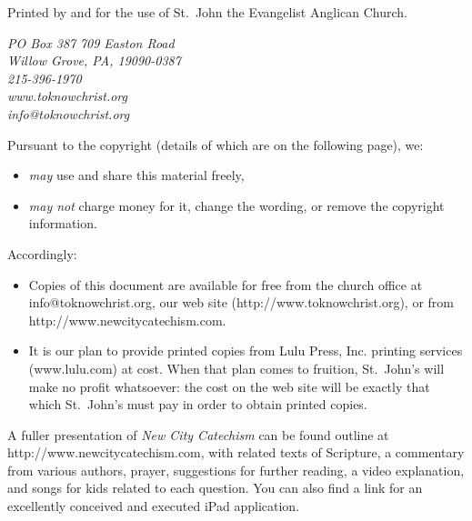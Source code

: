 Printed by and for the use of St.\ John the Evangelist Anglican Church.

\vspace{-1em}

\begin{center}
\emph{PO Box 387\,\textbullet\,709 Easton Road\\
Willow Grove, PA, 19090-0387\\
215-396-1970\\
www.toknowchrist.org\\
info@toknowchrist.org}
\end{center}

Pursuant to the copyright (details of which are on the following page), we:

\begin{itemize}
	\item {\em may}\/ use and share this material freely,
	\item {\em may not}\/ charge money for it, change the wording, or remove the copyright information.
\end{itemize}

Accordingly:

\begin{itemize}
	\item Copies of this document are available for free from the church office at info@to\hspace{0em}know\hspace{0em}christ.\hspace{0em}org, our web site (http:\slash{}\slash{}www.to\hspace{0em}know\hspace{0em}christ.org), or from http:\slash{}\slash{}www.new\hspace{0em}city\hspace{0em}cate\hspace{0em}chism.\hspace{0em}com.
	\item It is our plan to provide printed copies from Lulu Press, Inc. printing services (www.lulu.com) at cost. When that plan comes to fruition, St.\ John's will make no profit whatsoever: the cost on the web site will be exactly that which St.\ John's must pay in order to obtain printed copies.
\end{itemize}

A fuller presentation of {\em New City Catechism}\/ can be found outline at http:\slash{}\slash{}www.new\hspace{0em}city\hspace{0em}cat\hspace{0em}echism.\hspace{0em}com, with related texts of Scripture, a commentary from various authors, prayer, suggestions for further reading, a video explanation, and songs for kids related to each question. You can also find a link for an excellently conceived and executed iPad application.

